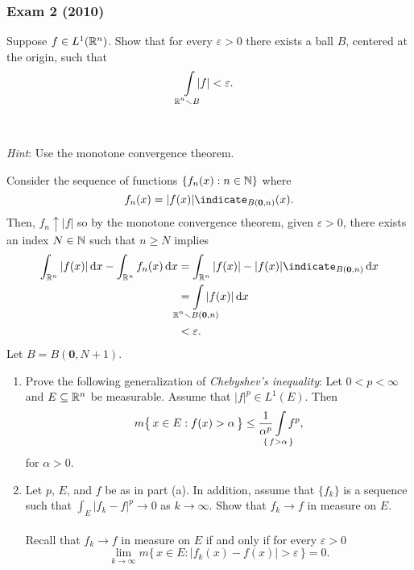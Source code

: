 \subsubsection{Exam 2 (2010)}
\setcounter{exercise}{0}
\setcounter{equation}{0}

\begin{problem}
  Suppose \(f\in L^1(\mathbb{R}^n)\). Show that for every \(\varepsilon>0\) there
  exists a ball \(B\), centered at the origin, such that
  \[
    \int\limsclap{\bbR^n\setminus B}|f|<\varepsilon.
  \]
  \\\\
  \emph{Hint}: Use the monotone convergence theorem.
\end{problem}
\begin{solution}
  Consider the sequence of functions \(\{f_n(x):n\in\mathbb{N}\}\) where
  \[
    f_n(x)=|f(x)|\indicate_{B(\mathbf{0},n)}(x).
  \]
  Then, \(f_n\uparrow |f|\) so by the monotone convergence theorem, given
  \(\varepsilon>0\), there exists an index \(N\in\mathbb{N}\) such that
  \(n\geq N\) implies
  \begin{align*}
    \int_{\bbR^n}|f(x)|\diff x-\int_{\bbR^n}f_n(x)\diff x
    &=\int_{\bbR^n}|f(x)|-|f(x)|\indicate_{B(\mathbf{0},n)}\diff x\\
    &=\int\limsclap{\bbR^n\setminus B(\mathbf{0},n)}|f(x)|\diff x\\
    &<\varepsilon.
  \end{align*}
  Let \(B=B(\mathbf{0},N+1)\).
\end{solution}
\begin{problem}
  \hfill
  \begin{enumerate}[label=(\alph*)]
  \item Prove the following generalization of \emph{Chebyshev's
      inequality}: Let \(0<p<\infty\) and \(E\subseteq\mathbb{R}^n\) be
    measurable. Assume that \(|f|^p\in L^1(E)\). Then
    \[
      m\bigl\{\,x\in E:f(x)>\alpha\,\bigr\}
      \leq\frac{1}{\alpha^p}\int\limsclap{\left\{\,f>\alpha\,\right\}}f^p,
    \]
    for \(\alpha>0\).
  \item Let \(p\), \(E\), and \(f\) be as in part (a). In addition, assume
    that \(\{f_k\}\) is a sequence such that \(\int_E|f_k-f|^p\to 0\) as
    \(k\to\infty\). Show that \(f_k\to f\) in measure on \(E\).
    \\\\
    Recall that \(f_k\to f\) in measure on \(E\) if and only if for every
    \(\varepsilon>0\)
    \[
      \lim_{k\to\infty}m\bigl\{\,x\in
      E:|f_k(x)-f(x)|>\varepsilon\,\bigr\}=0.
    \]
\end{enumerate}
\end{problem}
